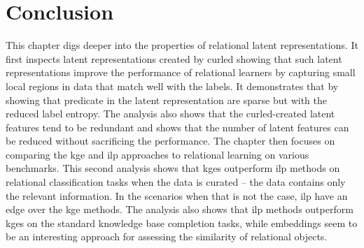 %
%



\section{Conclusion}


This chapter digs deeper into the properties of relational latent representations.
It first inspects latent representations created by \gls{curled} showing that such latent representations improve the performance of relational learners by capturing small local regions in data that match well with the labels.
It demonstrates that by showing that predicate in the latent representation are sparse but with the reduced label entropy.
The analysis also shows that the \gls{curled}-created latent features tend to be redundant and shows that the number of latent features can be reduced without sacrificing the performance.
The chapter then focuses on comparing the \gls{kge} and \gls{ilp} approaches to relational learning on various benchmarks.
This second analysis shows that \gls{kge}s outperform \gls{ilp} methods on relational classification tasks when the data is curated -- the data contains only the relevant information.
In the scenarios when that is not the case, \gls{ilp} have an edge over the \gls{kge} methods.
The analysis also shows that \gls{ilp} methods outperform \gls{kge}s on the standard knowledge base completion tasks, while embeddings seem to be an interesting approach for assessing the similarity of relational objects.



\cleardoublepage

